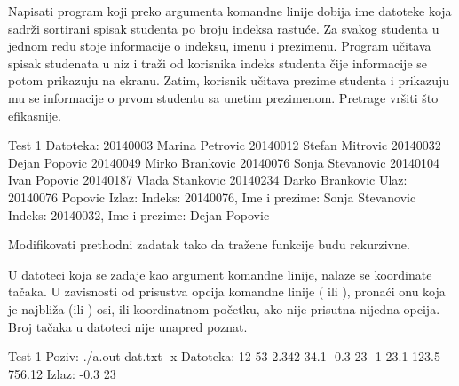 \begin{Exercise}[label=402]
  Napisati program koji preko argumenta komandne linije dobija ime
  datoteke koja sadrži sortirani spisak studenta po broju indeksa
  rastuće. Za svakog studenta u jednom redu stoje informacije o
  indeksu, imenu i prezimenu.  Program učitava spisak studenata u niz
  i traži od korisnika indeks studenta čije informacije se potom
  prikazuju na ekranu.  Zatim, korisnik učitava prezime studenta i
  prikazuju mu se informacije o prvom studentu sa unetim prezimenom.
  Pretrage vršiti što efikasnije.
  
\begin{maxitest}
\begin{test}{Test 1}
Datoteka:
20140003 Marina Petrovic
20140012 Stefan Mitrovic
20140032 Dejan Popovic
20140049 Mirko Brankovic
20140076 Sonja Stevanovic
20140104 Ivan Popovic
20140187 Vlada Stankovic
20140234 Darko Brankovic
Ulaz:
20140076
Popovic
Izlaz:
Indeks: 20140076, Ime i prezime: Sonja Stevanovic
Indeks: 20140032, Ime i prezime: Dejan Popovic
\end{test}
\end{maxitest}
  
\end{Exercise}

\begin{Exercise}[label=403]
  Modifikovati prethodni zadatak tako da tražene funkcije budu
  rekurzivne.
\end{Exercise}

\begin{Exercise}[label=404]
  U datoteci koja se zadaje kao argument komandne linije, nalaze se
  koordinate tačaka. U zavisnosti od prisustva opcija komandne linije
  ( ili ), pronaći onu koja je najbliža 
  (ili ) osi, ili koordinatnom početku, ako nije prisutna
  nijedna opcija. Broj tačaka u datoteci nije unapred poznat.
  
\begin{miditest}
\begin{test}{Test 1}
Poziv: ./a.out dat.txt -x
Datoteka:
12 53
2.342 34.1
-0.3 23
-1 23.1
123.5 756.12
Izlaz: -0.3 23
\end{test}
\end{miditest}
  
\end{Exercise}

